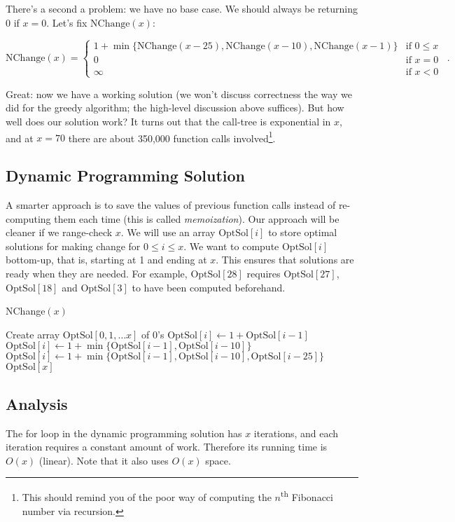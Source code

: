 \documentclass[paper=a4, fontsize=11pt]{scrartcl} %
\numberwithin{equation}{section} %
\numberwithin{figure}{section} %
\numberwithin{table}{section} %
\begin{document}
There's a second a problem: we have no base case.
We should always be returning $0$ if $x = 0$.
Let's fix $\mathrm{NChange}(x)$:

\begin{equation}
\mathrm{NChange}(x) = 
\begin{cases}
1 + \min\{\mathrm{NChange}(x-25), \mathrm{NChange}(x-10), \mathrm{NChange}(x-1)\} & \mbox{if } 0 \leq x\\
0 & \mbox{if } x = 0\\
\infty & \mbox{if } x < 0 
\end{cases}\enspace .
\end{equation}

Great: now we have a working solution (we won't discuss correctness the way we did for the greedy algorithm; the high-level discussion above suffices).
But how well does our solution work?
It turns out that the call-tree is exponential in $x$, and at $x = 70$ there are about 350,000 function calls involved\footnote{This should remind you of the poor way of computing the $n$\textsuperscript{th} Fibonacci number via recursion.}.

\subsection*{Dynamic Programming Solution}

A smarter approach is to save the values of previous function calls instead of re-computing them each time (this is called \emph{memoization}).
Our approach will be cleaner if we range-check $x$.
We will use an array $\mbox{OptSol}[i]$ to store optimal solutions for making change for $0 \leq i \leq x$.
We want to compute $\mbox{OptSol}[i]$ bottom-up, that is, starting at 1 and ending at $x$.
This ensures that solutions are ready when they are needed.
For example, $\mbox{OptSol}[28]$ requires $\mbox{OptSol}[27]$, $\mbox{OptSol}[18]$ and $\mbox{OptSol}[3]$ to have been computed beforehand.

\begin{algorithm}
\caption{NChange$(x)$}
\begin{algorithmic}
\State Create array $\mbox{OptSol}[0, 1, \ldots x]$ of 0's
\State $\mbox{OptSol}[i] \gets 1 + \mbox{OptSol}[i - 1]$
\State $\mbox{OptSol}[i] \gets 1 + \min\{ \mbox{OptSol}[i - 1], \mbox{OptSol}[i - 10]\}$
\Else
\State $\mbox{OptSol}[i] \gets 1 + \min\{ \mbox{OptSol}[i - 1], \mbox{OptSol}[i - 10], \mbox{OptSol}[i - 25] \}$
\EndIf
\EndFor
\State \Return $\mbox{OptSol}[x]$
\end{algorithmic}
\end{algorithm}

\subsection*{Analysis}
The for loop in the dynamic programming solution has $x$ iterations, and each iteration requires a constant amount of work.
Therefore its running time is $O(x)$ (linear).
Note that it also uses $O(x)$ space.
\end{document}
